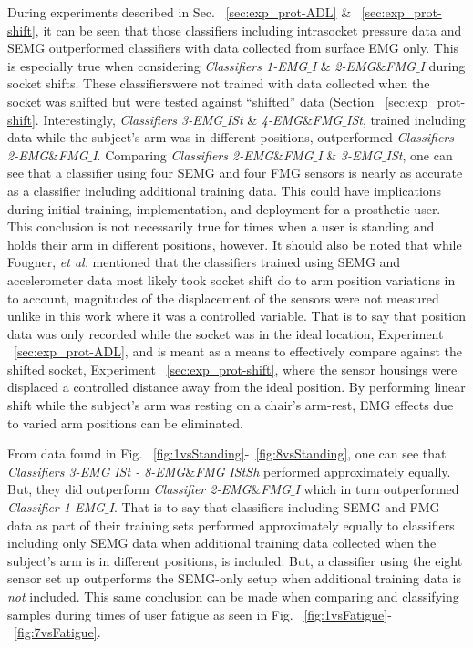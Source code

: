 \documentclass[twocolumn]{sagej}
\begin{document}
During experiments described in Sec. ~\ref{sec:exp_prot-ADL} \& ~\ref{sec:exp_prot-shift}, it can be seen that those classifiers including intrasocket pressure data and SEMG outperformed classifiers with data collected from surface EMG only.  This is especially true when considering \textit{Classifiers 1-EMG$\_$I} \& \textit{2-EMG$\&$FMG$\_$I} during socket shifts.  These classifierswere not trained with data collected when the socket was shifted but were tested against ``shifted'' data (Section ~\ref{sec:exp_prot-shift}.  Interestingly, \textit{Classifiers 3-EMG$\_$ISt} \& \textit{4-EMG$\&$FMG$\_$ISt}, trained including data while the subject's arm was in different positions, outperformed \textit{Classifiers 2-EMG$\&$FMG$\_$I}.  Comparing \textit{Classifiers 2-EMG$\&$FMG$\_$I} \& \textit{3-EMG$\_$ISt}, one can see that a classifier using four SEMG and four FMG sensors is nearly as accurate as a classifier including additional training data.  This could have implications during initial training, implementation, and deployment for a prosthetic user.  This conclusion is not necessarily true for times when a user is standing and holds their arm in different positions, however.  It should also be noted that while Fougner, \textit{et al.} mentioned that the classifiers trained using SEMG and accelerometer data most likely took socket shift do to arm position variations in to account, magnitudes of the displacement of the sensors were not measured unlike in this work where it was a controlled variable. That is to say that position data was only recorded while the socket was in the ideal location, Experiment ~\ref{sec:exp_prot-ADL}, and is meant as a means to effectively compare against the shifted socket, Experiment ~\ref{sec:exp_prot-shift}, where the sensor housings were displaced a controlled distance away from the ideal position.  By performing linear shift while the subject's arm was resting on a chair's arm-rest, EMG effects due to varied arm positions can be eliminated.\par \noindent
From data found in Fig. ~\ref{fig:1vsStanding}-~\ref{fig:8vsStanding}, one can see that \textit{Classifiers 3-EMG$\_$ISt - 8-EMG$\&$FMG$\_$IStSh} performed approximately equally.  But, they did outperform \textit{Classifier 2-EMG$\&$FMG$\_$I} which in turn outperformed \textit{Classifier 1-EMG$\_$I}.  That is to say that classifiers including SEMG and FMG data as part of their training sets performed approximately equally to classifiers including only SEMG data when additional training data collected when the subject's arm is in different positions, is included.  But, a classifier using the eight sensor set up outperforms the SEMG-only setup when additional training data is \textit{not} included.  This same conclusion can be made when comparing and classifying samples during times of user fatigue as seen in Fig. ~\ref{fig:1vsFatigue}-~\ref{fig:7vsFatigue}.   \par \noindent
\end{document}
